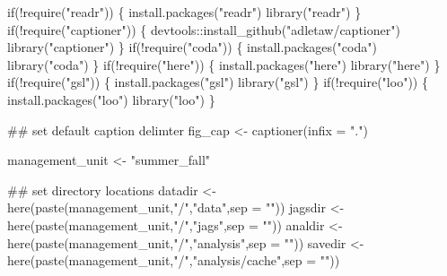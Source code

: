\documentclass[
  11pt,
]{article}
\newenvironment{Shaded}{}{}
\newcommand{\CommentTok}[1]{\textcolor[rgb]{0.00,0.50,0.00}{#1}}
\newcommand{\ControlFlowTok}[1]{\textcolor[rgb]{0.00,0.00,1.00}{#1}}
\newcommand{\DataTypeTok}[1]{#1}
\newcommand{\KeywordTok}[1]{\textcolor[rgb]{0.00,0.00,1.00}{#1}}
\newcommand{\NormalTok}[1]{#1}
\newcommand{\OperatorTok}[1]{#1}
\newcommand{\StringTok}[1]{\textcolor[rgb]{0.00,0.50,0.50}{#1}}
\begin{document}
\begin{Shaded}
\begin{Highlighting}[]
\ControlFlowTok{if}\NormalTok{(}\OperatorTok{!}\KeywordTok{require}\NormalTok{(}\StringTok{"readr"}\NormalTok{)) \{}
  \KeywordTok{install.packages}\NormalTok{(}\StringTok{"readr"}\NormalTok{)}
  \KeywordTok{library}\NormalTok{(}\StringTok{"readr"}\NormalTok{)}
\NormalTok{\}}
\ControlFlowTok{if}\NormalTok{(}\OperatorTok{!}\KeywordTok{require}\NormalTok{(}\StringTok{"captioner"}\NormalTok{)) \{}
\NormalTok{  devtools}\OperatorTok{::}\KeywordTok{install_github}\NormalTok{(}\StringTok{"adletaw/captioner"}\NormalTok{)}
  \KeywordTok{library}\NormalTok{(}\StringTok{"captioner"}\NormalTok{)}
\NormalTok{\}}
\ControlFlowTok{if}\NormalTok{(}\OperatorTok{!}\KeywordTok{require}\NormalTok{(}\StringTok{"coda"}\NormalTok{)) \{}
  \KeywordTok{install.packages}\NormalTok{(}\StringTok{"coda"}\NormalTok{)}
  \KeywordTok{library}\NormalTok{(}\StringTok{"coda"}\NormalTok{)}
\NormalTok{\}}
\ControlFlowTok{if}\NormalTok{(}\OperatorTok{!}\KeywordTok{require}\NormalTok{(}\StringTok{"here"}\NormalTok{)) \{}
  \KeywordTok{install.packages}\NormalTok{(}\StringTok{"here"}\NormalTok{)}
  \KeywordTok{library}\NormalTok{(}\StringTok{"here"}\NormalTok{)}
\NormalTok{\}}
\ControlFlowTok{if}\NormalTok{(}\OperatorTok{!}\KeywordTok{require}\NormalTok{(}\StringTok{"gsl"}\NormalTok{)) \{}
  \KeywordTok{install.packages}\NormalTok{(}\StringTok{"gsl"}\NormalTok{)}
  \KeywordTok{library}\NormalTok{(}\StringTok{"gsl"}\NormalTok{)}
\NormalTok{\}}
\ControlFlowTok{if}\NormalTok{(}\OperatorTok{!}\KeywordTok{require}\NormalTok{(}\StringTok{"loo"}\NormalTok{)) \{}
  \KeywordTok{install.packages}\NormalTok{(}\StringTok{"loo"}\NormalTok{)}
  \KeywordTok{library}\NormalTok{(}\StringTok{"loo"}\NormalTok{)}
\NormalTok{\}}

\CommentTok{## set default caption delimter}
\NormalTok{fig_cap <-}\StringTok{ }\KeywordTok{captioner}\NormalTok{(}\DataTypeTok{infix =} \StringTok{"."}\NormalTok{)}

\NormalTok{management_unit <-}\StringTok{ "summer_fall"}

\CommentTok{## set directory locations}
\NormalTok{datadir <-}\StringTok{ }\KeywordTok{here}\NormalTok{(}\KeywordTok{paste}\NormalTok{(management_unit,}\StringTok{"/"}\NormalTok{,}\StringTok{"data"}\NormalTok{,}\DataTypeTok{sep =} \StringTok{""}\NormalTok{))}
\NormalTok{jagsdir <-}\StringTok{ }\KeywordTok{here}\NormalTok{(}\KeywordTok{paste}\NormalTok{(management_unit,}\StringTok{"/"}\NormalTok{,}\StringTok{"jags"}\NormalTok{,}\DataTypeTok{sep =} \StringTok{""}\NormalTok{))}
\NormalTok{analdir <-}\StringTok{ }\KeywordTok{here}\NormalTok{(}\KeywordTok{paste}\NormalTok{(management_unit,}\StringTok{"/"}\NormalTok{,}\StringTok{"analysis"}\NormalTok{,}\DataTypeTok{sep =} \StringTok{""}\NormalTok{))}
\NormalTok{savedir <-}\StringTok{ }\KeywordTok{here}\NormalTok{(}\KeywordTok{paste}\NormalTok{(management_unit,}\StringTok{"/"}\NormalTok{,}\StringTok{"analysis/cache"}\NormalTok{,}\DataTypeTok{sep =} \StringTok{""}\NormalTok{))}


\end{Highlighting}
\end{Shaded}
\end{document}
